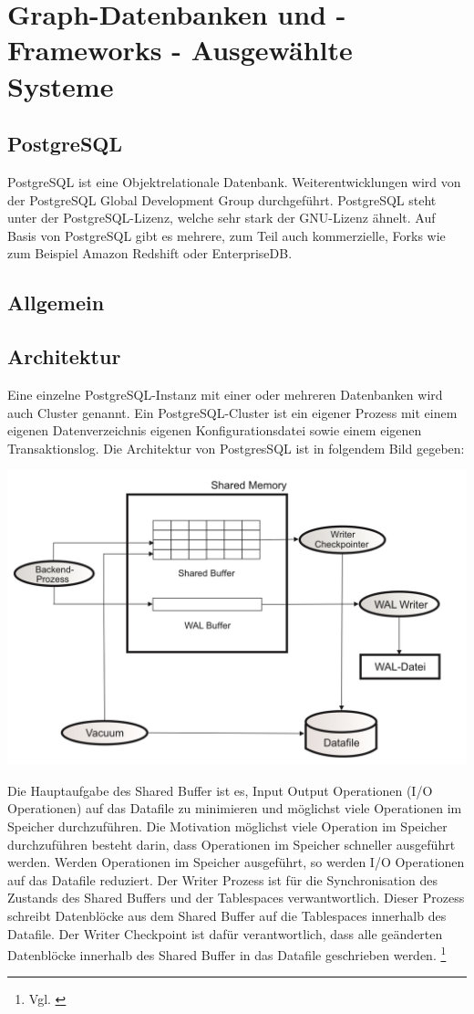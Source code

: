 \chapter{Graph-Datenbanken und -Frameworks - Ausgewählte Systeme }
\section{PostgreSQL}
PostgreSQL ist eine Objektrelationale Datenbank. Weiterentwicklungen wird von der PostgreSQL Global Development Group durchgeführt. PostgreSQL steht unter der PostgreSQL-Lizenz, welche sehr stark der GNU-Lizenz ähnelt. Auf Basis von PostgreSQL gibt es mehrere, zum Teil auch kommerzielle, Forks wie zum Beispiel Amazon Redshift oder EnterpriseDB.
\section{Allgemein}
\newpage
\section{Architektur}
Eine einzelne PostgreSQL-Instanz mit einer oder mehreren Datenbanken wird auch Cluster genannt. Ein PostgreSQL-Cluster ist ein eigener Prozess mit einem eigenen Datenverzeichnis eigenen Konfigurationsdatei sowie einem eigenen Transaktionslog.
Die Architektur von PostgresSQL ist in folgendem Bild gegeben:
\begin{center}
    \includegraphics[width = \linewidth]{./images/PostgresSQLArchitektur.jpg}
\end{center}
Die Hauptaufgabe des Shared Buffer ist es, Input Output Operationen (I/O Operationen) auf das Datafile zu minimieren und möglichst viele Operationen im Speicher durchzuführen. Die Motivation möglichst viele Operation im Speicher durchzuführen
besteht darin, dass Operationen im Speicher schneller ausgeführt werden. Werden Operationen im Speicher ausgeführt, so werden I/O Operationen auf das Datafile reduziert. Der Writer Prozess ist für die Synchronisation
des Zustands des Shared Buffers und der Tablespaces verwantwortlich. Dieser Prozess schreibt Datenblöcke aus dem Shared Buffer auf die Tablespaces innerhalb des Datafile. Der Writer Checkpoint ist dafür verantwortlich,
dass alle geänderten Datenblöcke innerhalb des Shared Buffer in das Datafile geschrieben werden. \footnote{Vgl. \cite[Seite 26]{froehlich01}} \\
